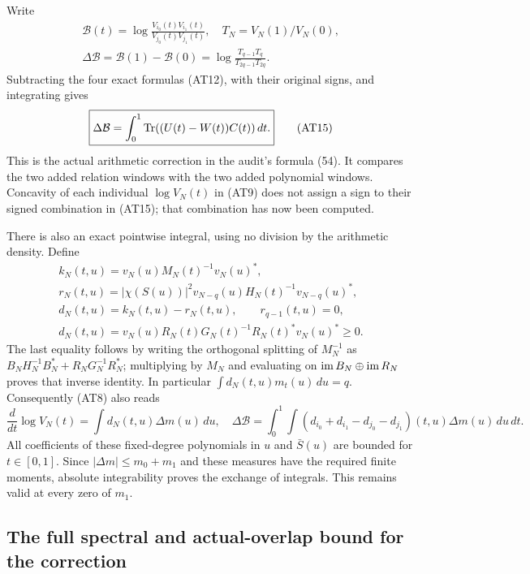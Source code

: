 Write
\[
 \begin{gathered}
 \mathcal B(t)=\log\frac{V_{i_0}(t)V_{i_1}(t)}{V_{j_0}(t)V_{j_1}(t)},
 \quad T_N=V_N(1)/V_N(0),\\
 \Delta\mathcal B=\mathcal B(1)-\mathcal B(0)
 =\log\frac{T_{q-1}T_q}{T_{2q-1}T_{2q}}.       \end{gathered}
 \tag{AT14}
\]
Subtracting the four exact formulas (AT12), with their original
signs, and integrating gives
\[
 \boxed{\displaystyle
 \Delta\mathcal B=\int_0^1\operatorname{Tr}((U(t)-W(t))C(t))\,dt .}
                                                        \tag{AT15}
\]
This is the actual arithmetic correction in the audit's formula
(54). It compares the two added relation windows with the two
added polynomial windows. Concavity of each individual
$\log V_N(t)$ in (AT9) does not assign a sign to their signed
combination in (AT15); that combination has now been computed.

There is also an exact pointwise integral, using no division by
the arithmetic density. Define
\[
 \begin{gathered}
 k_N(t,u)=v_N(u)M_N(t)^{-1}v_N(u)^*,\\
 r_N(t,u)=|\chi(S(u))|^2
 v_{N-q}(u)H_N(t)^{-1}v_{N-q}(u)^*,\\
 d_N(t,u)=k_N(t,u)-r_N(t,u),\qquad r_{q-1}(t,u)=0,\\
 d_N(t,u)=v_N(u)R_N(t)G_N(t)^{-1}R_N(t)^*v_N(u)^*\ge0.
                                                        \end{gathered}
 \tag{AT16}
\]
The last equality follows by writing the orthogonal splitting
of $M_N^{-1}$ as
$B_NH_N^{-1}B_N^*+R_NG_N^{-1}R_N^*$; multiplying by $M_N$
and evaluating on $\operatorname{im} B_N\oplus\operatorname{im} R_N$ proves that inverse
identity. In particular $\int d_N(t,u)m_t(u)\,du=q$.
Consequently (AT8) also reads
\[
 \frac{d}{dt}\log V_N(t)=\int d_N(t,u)\Delta m(u)\,du,
\quad
 \Delta\mathcal B=\int_0^1\int
 (d_{i_0}+d_{i_1}-d_{j_0}-d_{j_1})(t,u)\Delta m(u)\,du\,dt.
                                                        \tag{AT17}
\]
All coefficients of these fixed-degree polynomials in $u$ and
$\bar S(u)$ are bounded for $t\in[0,1]$. Since
$|\Delta m|\le m_0+m_1$ and these measures have the required
finite moments, absolute integrability proves the exchange of
integrals. This remains valid at every zero of $m_1$.

\subsection{The full spectral and actual-overlap bound for the correction}

